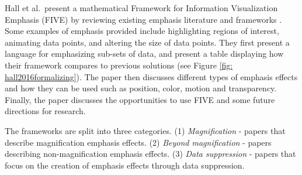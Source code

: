 
Hall et al.\ present a mathematical Framework for Information Visualization Emphasis (FIVE) by reviewing existing emphasis literature and frameworks \cite{hall2016formalizing}. Some examples of emphasis provided include highlighting regions of interest, animating data points, and altering the size of data points.
They first present a language for emphasizing sub-sets of data, and present a table displaying how their framework compares to previous solutions (see Figure \ref{fig: hall2016formalizing}). The paper then discusses different types of emphasis effects and how they can be used such as position, color, motion and transparency. Finally, the paper discusses the opportunities to use FIVE and some future directions for research.

The frameworks are split into three categories. (1) \textit{Magnification} - papers that describe magnification emphasis effects. (2) \textit{Beyond magnification} - papers describing non-magnification emphasis effects. (3) \textit{Data suppression} - papers that focus on the creation of emphasis effects through data suppression. 

